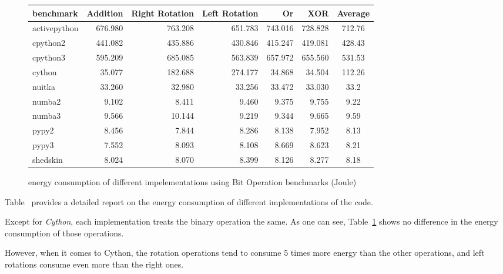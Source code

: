 \begin{figure}[!hbt]
    \begin{tabular}{|lrrrrr|c|}
        \toprule
        benchmark    & Addition & Right Rotation & Left Rotation & Or      & XOR     & Average \\
        \midrule
        activepython & 676.980  & 763.208        & 651.783       & 743.016 & 728.828 & 712.76  \\
        cpython2     & 441.082  & 435.886        & 430.846       & 415.247 & 419.081 & 428.43  \\
        cpython3     & 595.209  & 685.085        & 563.839       & 657.972 & 655.560 & 531.53  \\
        \hline
        cython       & 35.077   & 182.688        & 274.177       & 34.868  & 34.504  & 112.26  \\
        nuitka       & 33.260   & 32.980         & 33.256        & 33.472  & 33.030  & 33.2    \\
        \hline
        numba2       & 9.102    & 8.411          & 9.460         & 9.375   & 9.755   & 9.22    \\
        numba3       & 9.566    & 10.144         & 9.219         & 9.344   & 9.665   & 9.59    \\
        pypy2        & 8.456    & 7.844          & 8.286         & 8.138   & 7.952   & 8.13    \\
        pypy3        & 7.552    & 8.093          & 8.108         & 8.669   & 8.623   & 8.21    \\
        shedskin     & 8.024    & 8.070          & 8.399         & 8.126   & 8.277   & 8.18    \\
        \bottomrule
    \end{tabular}
    \caption{energy consumption of different impelementations using Bit Operation benchmarks (Joule) }
    \label{table:bitops}
\end{figure}



Table~ provides a detailed report on the energy consumption of different implementations of the code.

Except for \emph{Cython}, each implementation treats the binary operation the same. As one can see, Table~\ref{table:bitops} shows no difference in the energy consumption of those operations.

However, when it comes to Cython, the rotation operations tend to consume 5 times more energy than the other operations, and left rotations consume even more than the right ones.

